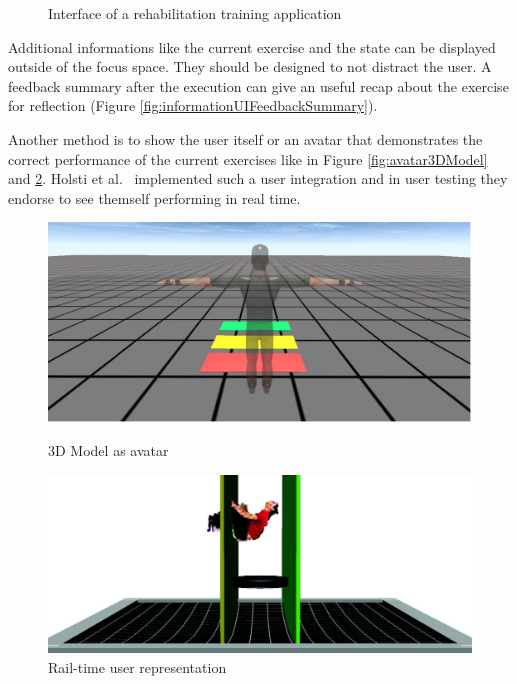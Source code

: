 \begin{figure}[htb]
\begin{minipage}[t]{0.49\linewidth}
		\label{fig:informationUIFeedbackSummary}
	\end{minipage}
	\caption{Interface of a rehabilitation training application~\cite{Garrido2013-zs}}
	\label{fig:informationUIGarrido}
\end{figure}
Additional informations like the current exercise and the state can be displayed outside of the focus space. They should be designed to not distract the user. A feedback summary after the execution can give an useful recap about the exercise for reflection (Figure \ref{fig:informationUIFeedbackSummary}).

Another method is to show the user itself or an avatar that demonstrates the correct performance of the current exercises like in Figure \ref{fig:avatar3DModel} and \ref{fig:avatarUser}. Holsti et al.~\cite{Holsti2013-kn} implemented such a user integration and in user testing they endorse to see themself performing in real time.
\begin{figure}[htb]
	\centering
	\begin{minipage}[t]{0.49\linewidth}
		\centering
		\includegraphics[width=1\linewidth]{Pictures/avatar3DModel}
		\caption{3D Model as avatar~\cite{Estepa2016-oj}}
		\label{fig:avatar3DModel}
	\end{minipage}
	\hfill
	\begin{minipage}[t]{0.49\linewidth}
		\centering
		\includegraphics[width=1\linewidth]{Pictures/avatarUser}
		\caption{Rail-time user representation~\cite{Holsti2013-kn}}
		\label{fig:avatarUser}
	\end{minipage}
\end{figure}

